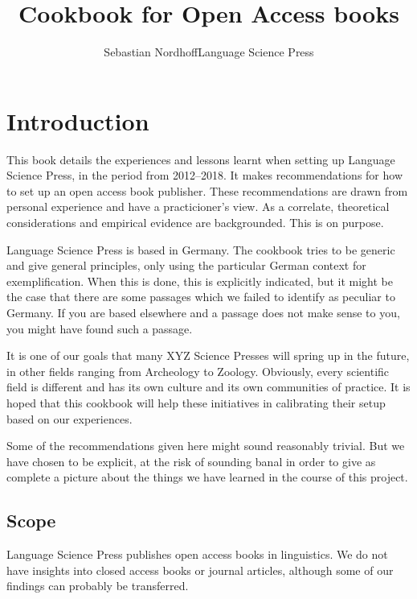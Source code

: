 \documentclass[guidelines,nonflat,modfonts] {langsci/langscibook}
\title{Cookbook for Open Access books}
\author{Sebastian Nordhoff\newlineCover Language Science Press}
\begin{document}
\maketitle
\frontmatter 
\tableofcontents 
\mainmatter
\chapter{Introduction}
\largerpage
This book details the experiences and lessons learnt when setting up Language Science Press, in the period from 2012--2018. It makes recommendations for how to set up an open access book publisher. These recommendations are drawn from personal experience and have a practicioner's view. As a correlate, theoretical considerations and empirical evidence are backgrounded. This is on purpose. 

Language Science Press is based in Germany. The cookbook tries to be generic and give general principles, only using the particular German context for exemplification. When this is done, this is explicitly indicated, but it might be the case that there are some passages which we failed to identify as peculiar to Germany. If you are based elsewhere and a passage does not make sense to you, you might have found such a passage.


It is one of our goals that many XYZ Science Presses will spring up in the future, in other fields ranging from Archeology to Zoology. Obviously, every scientific field is different and has its own culture and its own communities of practice. It is hoped that this cookbook will help these initiatives in calibrating their setup based on our experiences. 

Some of the recommendations given here might sound reasonably trivial. But we have chosen to be explicit, at the risk of sounding banal in order to give as complete a picture about the things we have learned in the course of this project.

\section{Scope}
Language Science Press publishes open access books in linguistics. We do not have insights into closed access books or journal articles, although some of our findings can probably be transferred. 
\end{document}
